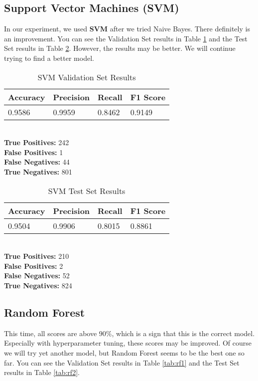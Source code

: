 \documentclass[conference]{IEEEtran}
\begin{document}
\subsection{Support Vector Machines (SVM)}
In our experiment, we used \textbf{SVM} after we tried Naive Bayes. There definitely is an improvement. You can see the Validation Set results in Table \ref{tab:svm1} and the Test Set results in Table \ref{tab:svm2}. However, the results may be better. We will continue trying to find a better model.

\begin{table}[H]
    \caption{SVM Validation Set Results}

    \begin{tabularx}{\linewidth}{|X|X|X|X|}
        \hline
        \textbf{Accuracy} & \textbf{Precision} & \textbf{Recall} & \textbf{F1 Score} \\
        \hline
        0.9586 & 0.9959 & 0.8462 & 0.9149 \\
        \hline
    \end{tabularx}\\

    \textbf{True Positives:} 242\\
    \textbf{False Positives:} 1\\
    \textbf{False Negatives:} 44\\
    \textbf{True Negatives:} 801
    \label{tab:svm1}
\end{table}

\begin{table}[H]
    \caption{SVM Test Set Results}

    \begin{tabularx}{\linewidth}{|X|X|X|X|}
        \hline
        \textbf{Accuracy} & \textbf{Precision} & \textbf{Recall} & \textbf{F1 Score} \\
        \hline
        0.9504 & 0.9906 & 0.8015 & 0.8861 \\
        \hline
    \end{tabularx}\\

    \textbf{True Positives:} 210\\
    \textbf{False Positives:} 2\\
    \textbf{False Negatives:} 52\\
    \textbf{True Negatives:} 824
    \label{tab:svm2}
\end{table}

\subsection{Random Forest}
This time, all scores are above $90\%$, which is a sign that this is the correct model. Especially with hyperparameter tuning, these scores may be improved. Of course we will try yet another model, but Random Forest seems to be the best one so far. You can see the Validation Set results in Table \ref{tab:rf1} and the Test Set results in Table \ref{tab:rf2}.
\end{document}
